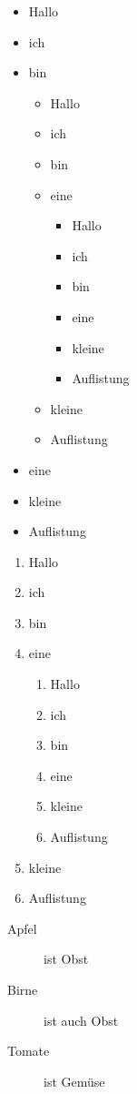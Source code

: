 \documentclass[12pt,ngerman,parskip=half]{scrartcl}
\begin{document}
\begin{itemize}
	\item Hallo
	\item ich 
	\item bin 
	
	\begin{itemize}
	\item Hallo
	\item ich 
	\item bin 
	\item eine 
	\begin{itemize}
	\item Hallo
	\item ich 
	\item bin 
	\item eine 
	\item kleine 
	\item Auflistung
\end{itemize}
	\item kleine 
	\item Auflistung
\end{itemize}
	
	\item eine 
	\item kleine 
	\item Auflistung
\end{itemize}

\begin{enumerate}
	\item Hallo
	\item ich 
	\item bin 
	\item eine 
	\begin{enumerate}
	\item Hallo
	\item ich 
	\item bin 
	\item eine 
	\item kleine 
	\item Auflistung
\end{enumerate}
	\item kleine 
	\item Auflistung
\end{enumerate}

\begin{description}
\item[Apfel] ist Obst
\item[Birne] ist auch Obst
\item[Tomate] ist Gemüse
\end{description}
\end{document}

